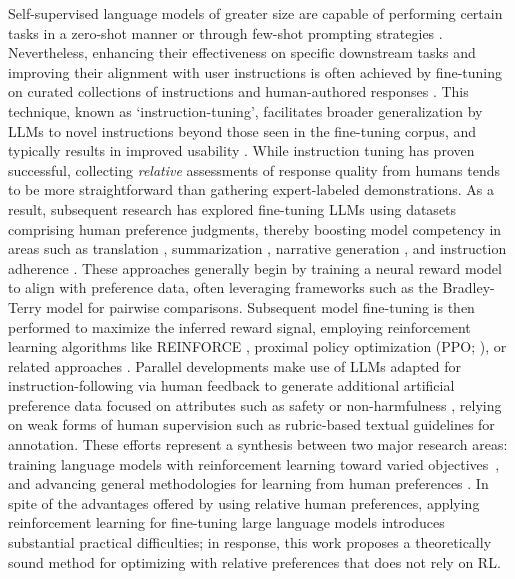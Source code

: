 Self-supervised language models of greater size are capable of performing certain tasks in a zero-shot manner \citep{radford2019language} or through few-shot prompting strategies \citep{gpt3,megatron,chowdhery2022palm}. Nevertheless, enhancing their effectiveness on specific downstream tasks and improving their alignment with user instructions is often achieved by fine-tuning on curated collections of instructions and human-authored responses \citep{mishra-etal-2022-cross,sanh2022multitask,chung2022scaling,thoppilan2022lamda}. This technique, known as `instruction-tuning', facilitates broader generalization by LLMs to novel instructions beyond those seen in the fine-tuning corpus, and typically results in improved usability \citep{chung2022scaling}. While instruction tuning has proven successful, collecting \textit{relative} assessments of response quality from humans tends to be more straightforward than gathering expert-labeled demonstrations. As a result, subsequent research has explored fine-tuning LLMs using datasets comprising human preference judgments, thereby boosting model competency in areas such as translation \citep{kreutzer-etal-2018-reliability}, summarization \citep{stiennon2022learning,ziegler2020finetuning}, narrative generation \citep{ziegler2020finetuning}, and instruction adherence \citep{ouyang2022training,ramamurthy2023is}. These approaches generally begin by training a neural reward model to align with preference data, often leveraging frameworks such as the Bradley-Terry model \citep{bradley1952rankanalysis} for pairwise comparisons. Subsequent model fine-tuning is then performed to maximize the inferred reward signal, employing reinforcement learning algorithms like REINFORCE \citep{williams1992reinforce}, proximal policy optimization (PPO; \cite{schulman2017proximal}), or related approaches \citep{ramamurthy2023is}. Parallel developments make use of LLMs adapted for instruction-following via human feedback to generate additional artificial preference data focused on attributes such as safety or non-harmfulness \citep{bai2022constitutional}, relying on weak forms of human supervision such as rubric-based textual guidelines for annotation. These efforts represent a synthesis between two major research areas: training language models with reinforcement learning toward varied objectives~\citep{Ranzato2015SequenceLT,paulus2018a,wu2018learning}, and advancing general methodologies for learning from human preferences \citep{christiano2017deep,kupcsik2018learning}. In spite of the advantages offered by using relative human preferences, applying reinforcement learning for fine-tuning large language models introduces substantial practical difficulties; in response, this work proposes a theoretically sound method for optimizing with relative preferences that does not rely on RL.

